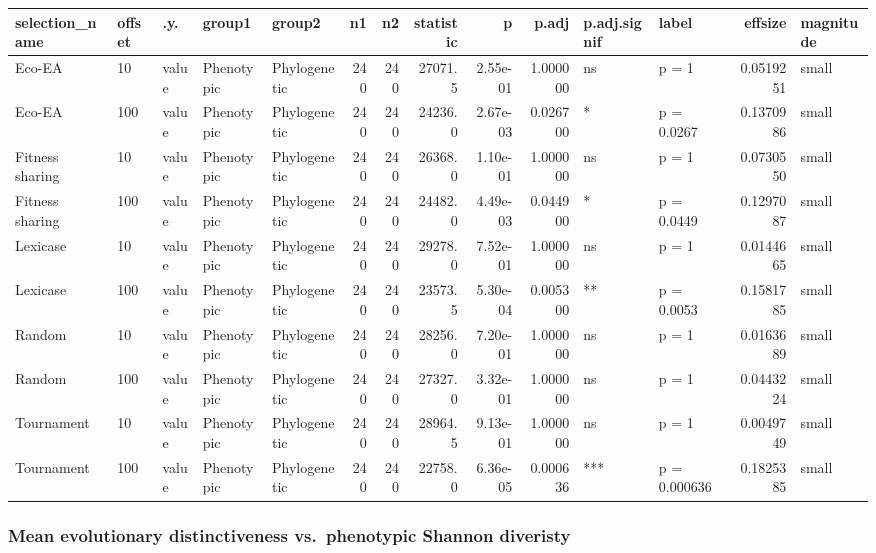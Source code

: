 \documentclass[]{book}
\begin{document}
\begin{table}
\centering
\begin{tabular}[t]{l|l|l|l|l|r|r|r|r|r|l|l|r|l}
\hline
selection\_name & offset & .y. & group1 & group2 & n1 & n2 & statistic & p & p.adj & p.adj.signif & label & effsize & magnitude\\
\hline
Eco-EA & 10 & value & Phenotypic & Phylogenetic & 240 & 240 & 27071.5 & 2.55e-01 & 1.000000 & ns & p = 1 & 0.0519251 & small\\
\hline
Eco-EA & 100 & value & Phenotypic & Phylogenetic & 240 & 240 & 24236.0 & 2.67e-03 & 0.026700 & * & p = 0.0267 & 0.1370986 & small\\
\hline
Fitness sharing & 10 & value & Phenotypic & Phylogenetic & 240 & 240 & 26368.0 & 1.10e-01 & 1.000000 & ns & p = 1 & 0.0730550 & small\\
\hline
Fitness sharing & 100 & value & Phenotypic & Phylogenetic & 240 & 240 & 24482.0 & 4.49e-03 & 0.044900 & * & p = 0.0449 & 0.1297087 & small\\
\hline
Lexicase & 10 & value & Phenotypic & Phylogenetic & 240 & 240 & 29278.0 & 7.52e-01 & 1.000000 & ns & p = 1 & 0.0144665 & small\\
\hline
Lexicase & 100 & value & Phenotypic & Phylogenetic & 240 & 240 & 23573.5 & 5.30e-04 & 0.005300 & ** & p = 0.0053 & 0.1581785 & small\\
\hline
Random & 10 & value & Phenotypic & Phylogenetic & 240 & 240 & 28256.0 & 7.20e-01 & 1.000000 & ns & p = 1 & 0.0163689 & small\\
\hline
Random & 100 & value & Phenotypic & Phylogenetic & 240 & 240 & 27327.0 & 3.32e-01 & 1.000000 & ns & p = 1 & 0.0443224 & small\\
\hline
Tournament & 10 & value & Phenotypic & Phylogenetic & 240 & 240 & 28964.5 & 9.13e-01 & 1.000000 & ns & p = 1 & 0.0049749 & small\\
\hline
Tournament & 100 & value & Phenotypic & Phylogenetic & 240 & 240 & 22758.0 & 6.36e-05 & 0.000636 & *** & p = 0.000636 & 0.1825385 & small\\
\hline
\end{tabular}
\end{table}

\hypertarget{mean-evolutionary-distinctiveness-vs.phenotypic-shannon-diveristy}{%
\subsubsection{Mean evolutionary distinctiveness vs.~phenotypic Shannon diveristy}\label{mean-evolutionary-distinctiveness-vs.phenotypic-shannon-diveristy}}
\end{document}
